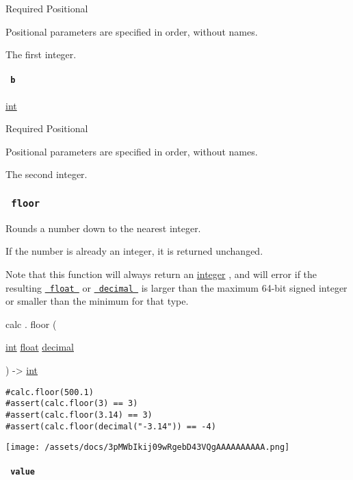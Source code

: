 {Required} {{ Positional }}

\label{functions-lcm-a-positional-tooltip}
Positional parameters are specified in order, without names.

The first integer.

\paragraph{\texorpdfstring{\texttt{\ b\ }}{ b }}\label{functions-lcm-b}

\href{/docs/reference/foundations/int/}{int}

{Required} {{ Positional }}

\label{functions-lcm-b-positional-tooltip}
Positional parameters are specified in order, without names.

The second integer.

\subsubsection{\texorpdfstring{\texttt{\ floor\ }}{ floor }}\label{functions-floor}

Rounds a number down to the nearest integer.

If the number is already an integer, it is returned unchanged.

Note that this function will always return an
\href{/docs/reference/foundations/int/}{integer} , and will error if the
resulting \href{/docs/reference/foundations/float/}{\texttt{\ float\ }}
or \href{/docs/reference/foundations/decimal/}{\texttt{\ decimal\ }} is
larger than the maximum 64-bit signed integer or smaller than the
minimum for that type.

calc { . } { floor } (

{ \href{/docs/reference/foundations/int/}{int}
\href{/docs/reference/foundations/float/}{float}
\href{/docs/reference/foundations/decimal/}{decimal} }

) -\textgreater{} \href{/docs/reference/foundations/int/}{int}

\begin{verbatim}
#calc.floor(500.1)
#assert(calc.floor(3) == 3)
#assert(calc.floor(3.14) == 3)
#assert(calc.floor(decimal("-3.14")) == -4)
\end{verbatim}

\texttt{[image: /assets/docs/3pMWbIkij09wRgebD43VQgAAAAAAAAAA.png]}

\paragraph{\texorpdfstring{\texttt{\ value\ }}{ value }}\label{functions-floor-value}

